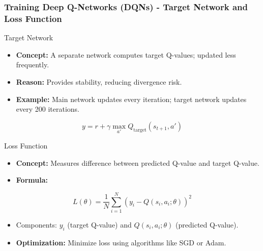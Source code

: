 \documentclass[aspectratio=169]{beamer}
\begin{document}
\begin{frame}[fragile]
    \frametitle{Training Deep Q-Networks (DQNs) - Target Network and Loss Function}
    \begin{block}{Target Network}
        \begin{itemize}
            \item \textbf{Concept:} A separate network computes target Q-values; updated less frequently.
            \item \textbf{Reason:} Provides stability, reducing divergence risk.
            \item \textbf{Example:} Main network updates every iteration; target network updates every 200 iterations.
        \end{itemize}
        
        \begin{equation}
            y = r + \gamma \max_{a'} Q_{\text{target}}(s_{t+1}, a')
        \end{equation}
    \end{block}
    
    \begin{block}{Loss Function}
        \begin{itemize}
            \item \textbf{Concept:} Measures difference between predicted Q-value and target Q-value.
            \item \textbf{Formula:}
            \end{itemize}
            
            \begin{equation}
                L(\theta) = \frac{1}{N} \sum_{i=1}^{N} (y_i - Q(s_i, a_i; \theta))^2
            \end{equation}
            
            \begin{itemize}
                \item Components: \(y_i\) (target Q-value) and \(Q(s_i, a_i; \theta)\) (predicted Q-value).
                \item \textbf{Optimization:} Minimize loss using algorithms like SGD or Adam.
            \end{itemize}
    \end{block}
\end{frame}
\end{document}
